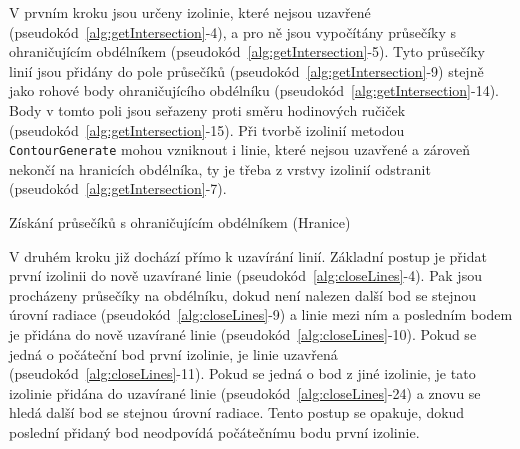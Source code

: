 V prvním kroku jsou určeny izolinie, které nejsou uzavřené (pseudokód~\ref{alg:getIntersection}-4), a pro ně jsou vypočítány průsečíky s ohraničujícím obdélníkem (pseudokód~\ref{alg:getIntersection}-5). Tyto průsečíky linií jsou přidány do pole průsečíků (pseudokód~\ref{alg:getIntersection}-9) stejně jako rohové body ohraničujícího obdélníku (pseudokód~\ref{alg:getIntersection}-14). Body v tomto poli jsou seřazeny proti směru hodinových ručiček (pseudokód~\ref{alg:getIntersection}-15). Při tvorbě izolinií metodou \texttt{ContourGenerate} mohou vzniknout i linie, které nejsou uzavřené a zároveň nekončí na hranicích obdélníka, ty je třeba z vrstvy izolinií odstranit (pseudokód~\ref{alg:getIntersection}-7).

\begin{algorithm}
\caption{Získání průsečíků s ohraničujícím obdélníkem (Hranice)}
\label{alg:getIntersection}
    \begin{algorithmic}[1] 
			\ELSE
			\ENDIF	
		\ENDIF
	\ENDWHILE
    \end{algorithmic}
\end{algorithm}

V druhém kroku již dochází přímo k uzavírání linií. Základní postup je přidat první izolinii do nově uzavírané linie (pseudokód~\ref{alg:closeLines}-4). Pak jsou procházeny průsečíky na obdélníku, dokud není nalezen další bod se stejnou úrovní radiace (pseudokód~\ref{alg:closeLines}-9) a linie mezi ním a posledním bodem je přidána do nově uzavírané linie (pseudokód~\ref{alg:closeLines}-10). Pokud se jedná o počáteční bod první izolinie, je linie uzavřená (pseudokód~\ref{alg:closeLines}-11). Pokud se jedná o bod z jiné izolinie, je tato izolinie přidána do uzavírané linie (pseudokód~\ref{alg:closeLines}-24) a znovu se hledá další bod se stejnou úrovní radiace. Tento postup se opakuje, dokud poslední přidaný bod neodpovídá počátečnímu bodu první izolinie.


